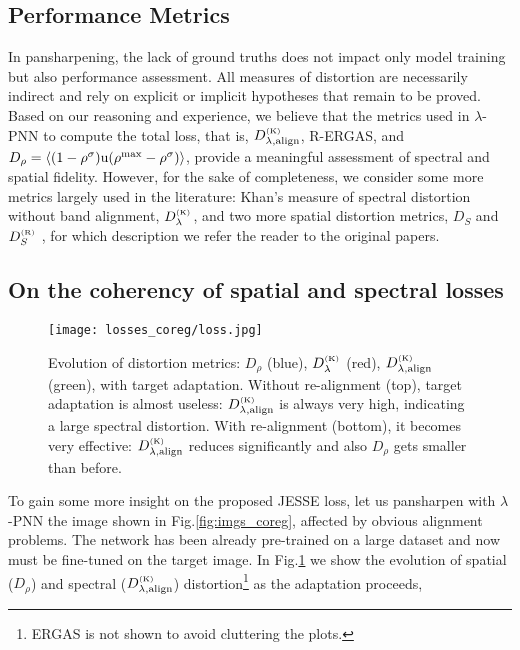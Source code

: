 \documentclass[journal]{IEEEtran}
\newcommand{\DL} {D^{_{\rm (K)}}_\lambda}
\newcommand{\DLa}{D^{_{\rm (K)}}_{\lambda, \rm align}}
\newcommand{\DR} {D_{\rho}}
\newcommand{\DS} {D_{S}}
\newcommand{\DSR}{D^{_{\rm (R)}}_S}
\begin{document}
\subsection{Performance Metrics}

In pansharpening, the lack of ground truths does not impact only model training but also performance assessment.
All measures of distortion are necessarily indirect and rely on explicit or implicit hypotheses that remain to be proved.
Based on our reasoning and experience,
we believe that the metrics used in $\lambda$-PNN to compute the total loss, that is, $\DLa$, R-ERGAS, and $\DR=\langle(1-\rho^{\sigma}) {\rm u}(\rho^{\max}-\rho^{\sigma})\rangle$,
provide a meaningful assessment of spectral and spatial fidelity.
However, for the sake of completeness,
we consider some more metrics largely used in the literature:
Khan's measure of spectral distortion without band alignment, $\DL$,
and two more spatial distortion metrics, $\DS$ \cite{Alparone2008} and $\DSR$ \cite{Alparone2018}, for which description we refer the reader to the original papers.



\subsection{On the coherency of spatial and spectral losses}

\begin{figure}
\centering
\texttt{[image: losses\_coreg/loss.jpg]}
\caption{
Evolution of distortion metrics: $\DR$ (blue), $\DL$ (red), $\DLa$ (green), with target adaptation.
Without re-alignment (top), target adaptation is almost useless: $\DLa$ is always very high, indicating a large spectral distortion.
With re-alignment (bottom), it becomes very effective: $\DLa$ reduces significantly and also $\DR$ gets smaller than before.
}
\label{fig:align_no_yes}
\end{figure}

To gain some more insight on the proposed JESSE loss, let us pansharpen with $\lambda$-PNN the image shown in Fig.\ref{fig:imgs_coreg},
affected by obvious alignment problems.
The network has been already pre-trained on a large dataset and now must be fine-tuned on the target image.
In Fig.\ref{fig:align_no_yes} we show the evolution of spatial ($\DR$) and spectral ($\DLa$) distortion\footnote{ERGAS is not shown to avoid cluttering the plots.}
as the adaptation proceeds,
\end{document}

